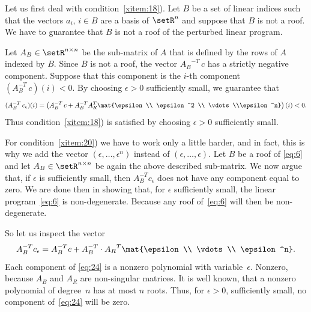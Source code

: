  Let us  first deal with condition~\ref{xitem:18}). Let 
 $B$ be a set of linear indices such that the vectors $a_i, \, i \in
 B$ are a basis of $\setR^n$ and suppose that $B$ is not a roof. We have
 to guarantee that $B$ is not a roof of the perturbed linear program. 

 Let $A_{B} \in  \setR^{n\times n}$ be the sub-matrix of $A$ that is defined
 by the rows of $A$ indexed by $B$. 
 Since $B$ is not a roof, the vector ${A_{B}}^{-T}\,c $ has a strictly
 negative component. Suppose that this component is the $i$-th
 component $(A_{B}^{-T}\,c)(i)<0$.  By choosing $\epsilon>0$ sufficiently small,
 we guarantee that   
 \begin{equation}
   (A_{B}^{-T}\,c_\epsilon)(i)  =  \left(A_{B}^{-T}\, c + A_{B}^{-T}A_R^T     \mat{\epsilon \\ \epsilon^2 \\ \vdots \\\epsilon^n}\right)(i)\label{eq:23}    <  0.               
 \end{equation}
               Thus condition~\ref{xitem:18}) is satisfied by choosing $\epsilon>0$
 sufficiently small. 

 For  condition~\ref{xitem:20}) we have to work only a little harder, and
 in fact, this is why we add the vector $(\epsilon,\ldots,\epsilon^n)$ instead of
 $(\epsilon,\ldots,\epsilon)$. Let $B$ be a roof  of \eqref{eq:6} 
 and let $A_{B} \in \setR^{n\times n}$ be again the above described
 sub-matrix. 
 We now argue that, if  $\epsilon$ is sufficiently small, then $A_{B}^{-T}c_\epsilon$
 does not have any component equal to  zero.  We are done then in
 showing that, for $\epsilon$ sufficiently small, the linear program~\eqref{eq:6} is
 non-degenerate. Because any  roof of~\eqref{eq:6}  will then be
 non-degenerate. 

 So let us inspect the vector 
 \begin{equation}
   \label{eq:24}
   A_{B}^{-T} c_\epsilon = A_{B}^{-T}c + A_{B}^{-T}\cdot {A_R}^T \mat{\epsilon \\ \vdots \\ \epsilon^n}. 
 \end{equation}
 Each component of \eqref{eq:24} is a nonzero polynomial with
 variable~$\epsilon$.  Nonzero, because $A_{B}$ and ${A_R}$ are non-singular
 matrices. It is well known, that a nonzero polynomial of degree~$n$
 has at most $n$ roots. Thus, for $\epsilon>0$, sufficiently  small, no
 component of~\eqref{eq:24} will be zero. 




